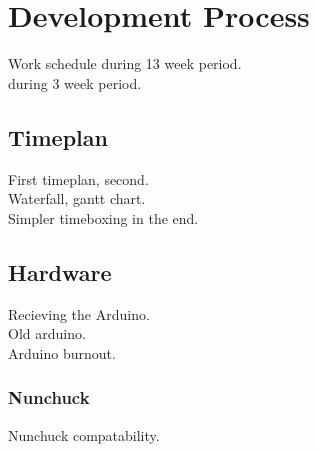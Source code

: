 \chapter{Development Process}
Work schedule during 13 week period.\\
during 3 week period.
\section{Timeplan}
First timeplan, second.\\
Waterfall, gantt chart.\\
Simpler timeboxing in the end.
\section{Hardware}
Recieving the Arduino.\\
Old arduino.\\
Arduino burnout.
\subsection{Nunchuck}
Nunchuck compatability.\\